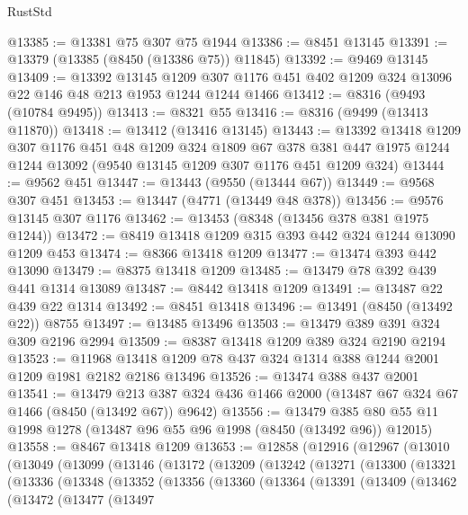\begin{lexlean}{RustStd}
\begin{coremodule}
@13385 := @13381 @75 @307 @75 @1944
@13386 := @8451 @13145
@13391 := @13379 (@13385 (@8450 (@13386 @75)) @11845)
@13392 := @9469 @13145
@13409 := @13392
    @13145
    @1209
    @307
    @1176
    @451
    @402
    @1209
    @324
    @13096
    @22
    @146
    @48
    @213
    @1953
    @1244
    @1244
    @1466
@13412 := @8316 (@9493 (@10784 @9495))
@13413 := @8321 @55
@13416 := @8316 (@9499 (@13413 @11870))
@13418 := @13412 (@13416 @13145)
@13443 := @13392
    @13418
    @1209
    @307
    @1176
    @451
    @48
    @1209
    @324
    @1809
    @67
    @378
    @381
    @447
    @1975
    @1244
    @1244
    @13092
    (@9540 @13145 @1209 @307 @1176 @451 @1209 @324)
@13444 := @9562 @451
@13447 := @13443 (@9550 (@13444 @67))
@13449 := @9568 @307 @451
@13453 := @13447 (@4771 (@13449 @48 @378))
@13456 := @9576 @13145 @307 @1176
@13462 := @13453 (@8348 (@13456 @378 @381 @1975 @1244))
@13472 := @8419 @13418 @1209 @315 @393 @442 @324 @1244 @13090 @1209 @453
@13474 := @8366 @13418 @1209
@13477 := @13474 @393 @442 @13090
@13479 := @8375 @13418 @1209
@13485 := @13479 @78 @392 @439 @441 @1314 @13089
@13487 := @8442 @13418 @1209
@13491 := @13487 @22 @439 @22 @1314
@13492 := @8451 @13418
@13496 := @13491 (@8450 (@13492 @22)) @8755
@13497 := @13485 @13496
@13503 := @13479 @389 @391 @324 @309 @2196 @2994
@13509 := @8387 @13418 @1209 @389 @324 @2190 @2194
@13523 := @11968 @13418 @1209 @78 @437 @324 @1314 @388 @1244 @2001 @1209 @1981 @2182 @2186 @13496
@13526 := @13474 @388 @437 @2001
@13541 := @13479
    @213
    @387
    @324
    @436
    @1466
    @2000
    (@13487 @67 @324 @67 @1466 (@8450 (@13492 @67)) @9642)
@13556 := @13479 @385 @80 @55 @11 @1998 @1278 (@13487 @96 @55 @96 @1998 (@8450 (@13492 @96)) @12015)
@13558 := @8467 @13418 @1209
@13653 := @12858
    (@12916
      (@12967
        (@13010
          (@13049
            (@13099
              (@13146
                (@13172
                  (@13209
                    (@13242
                      (@13271
                        (@13300
                          (@13321
                            (@13336
                              (@13348
                                (@13352
                                  (@13356
                                    (@13360
                                      (@13364
                                        (@13391
                                          (@13409
                                            (@13462
                                              (@13472
                                                (@13477
                                                  (@13497

\end{coremodule}
\end{lexlean}
